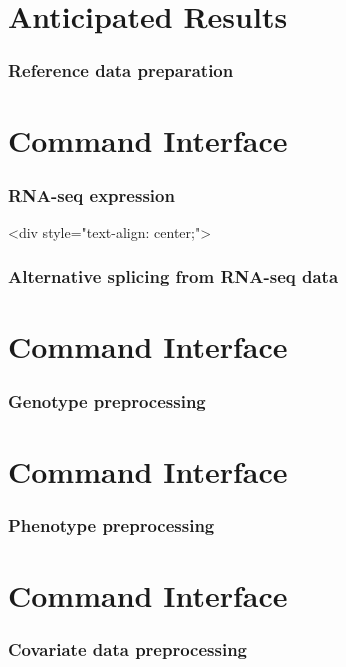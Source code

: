 \documentclass[12pt]{article}
\begin{document}
\section*{Anticipated Results}





\subsubsection*{Reference data preparation}


\section*{Command Interface}


\subsubsection*{RNA-seq expression}

<div style="text-align: center;">


\subsubsection*{Alternative splicing from RNA-seq data}


\section*{Command Interface}

\subsubsection*{Genotype preprocessing}


\section*{Command Interface}


\subsubsection*{Phenotype preprocessing}


\section*{Command Interface}


\subsubsection*{Covariate data preprocessing}
\end{document}
